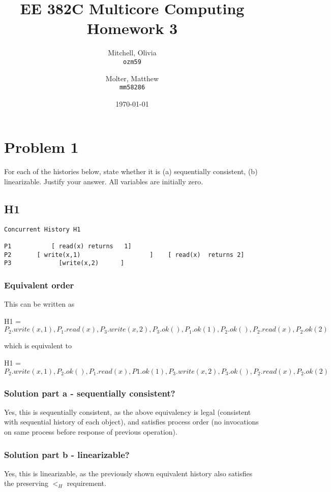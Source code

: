 \documentclass{article}
\title{EE 382C Multicore Computing Homework 3}
\author{
    Mitchell, Olivia\\
    \texttt{ozm59}
    \and
    Molter, Matthew\\
    \texttt{mm58286}}
\date{\today}
\begin{document}
\maketitle

\section{Problem 1}
For each of the histories below, state whether it is
(a) sequentially consistent, (b) linearizable. Justify your answer.
All variables are initially zero.

\subsection{H1}
\begin{verbatim}
Concurrent History H1

P1           [ read(x) returns   1]
P2       [ write(x,1)                   ]    [ read(x)  returns 2]
P3             [write(x,2)      ]            
\end{verbatim}

\subsubsection{Equivalent order}
This can be written as

H1 = $P_2.write(x, 1), P_1.read(x), P_3.write(x, 2), P_3.ok(), P_1.ok(1), P_2.ok(), P_2.read(x), P_2.ok(2)$

which is equivalent to 

H1 = $P_2.write(x, 1), P_2.ok(), P_1.read(x), P1.ok(1), P_3.write(x, 2), P_3.ok(), P_2.read(x), P_2.ok(2)$

\subsubsection{Solution part a - sequentially consistent?}
Yes, this is sequentially consistent, as the above equivalency is legal (consistent with sequential history of each object), and satisfies process order (no invocations on same process before response of previous operation).
\subsubsection{Solution part b - linearizable?}
Yes, this is linearizable, as the previously shown equivalent history also satisfies the preserving $<_H$ requirement.
\end{document}

